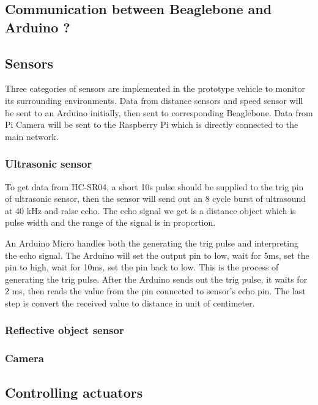 \documentclass[11pt, titlepage]{article} %
\begin{document}
\subsection{Communication between Beaglebone and Arduino ?}

\subsection{Sensors}
Three categories of sensors are implemented in the prototype vehicle to monitor its surrounding environments. Data from distance sensors and speed sensor will be sent to an Arduino initially, then sent to corresponding Beaglebone. Data from Pi Camera will be sent to the Raspberry Pi which is directly connected to the main network.
\subsubsection{Ultrasonic sensor}
To get data from HC-SR04, a short 10\textmu s pulse should be supplied to the trig pin of ultrasonic sensor, then the sensor will send out an 8 cycle burst of ultrasound at 40 kHz and raise echo. The echo signal we get is a distance object which is pulse width and the range of the signal is in proportion. 

An Arduino Micro handles both the generating the trig pulse and interpreting the echo signal. The Arduino will set the output pin to low, wait for 5ms, set the pin to high, wait for 10ms, set the pin back to low. This is the process of generating the trig pulse. After the Arduino sends out the trig pulse, it waits for 2 ms, then reads the value from the pin connected to sensor's echo pin. The last step is convert the received value to distance in unit of centimeter.

\subsubsection{Reflective object sensor}
\subsubsection{Camera}

\subsection{Controlling actuators}
\end{document}

